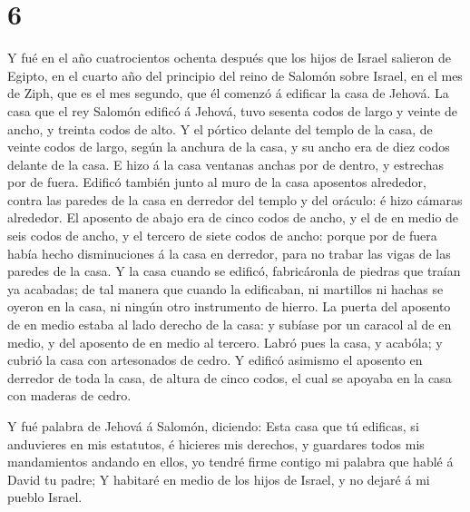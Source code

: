 \hypertarget{section-5}{%
\section{6}\label{section-5}}

 Y fué en el año cuatrocientos ochenta después que los hijos
de Israel salieron de Egipto, en el cuarto año del principio del reino
de Salomón sobre Israel, en el mes de Ziph, que es el mes segundo, que
él comenzó á edificar la casa de Jehová.  La casa que el rey
Salomón edificó á Jehová, tuvo sesenta codos de largo y veinte de ancho,
y treinta codos de alto.  Y el pórtico delante del templo de
la casa, de veinte codos de largo, según la anchura de la casa, y su
ancho era de diez codos delante de la casa.  E hizo á la
casa ventanas anchas por de dentro, y estrechas por de fuera.
 Edificó también junto al muro de la casa aposentos
alrededor, contra las paredes de la casa en derredor del templo y del
oráculo: é hizo cámaras alrededor.  El aposento de abajo era
de cinco codos de ancho, y el de en medio de seis codos de ancho, y el
tercero de siete codos de ancho: porque por de fuera había hecho
disminuciones á la casa en derredor, para no trabar las vigas de las
paredes de la casa.  Y la casa cuando se edificó,
fabricáronla de piedras que traían ya acabadas; de tal manera que cuando
la edificaban, ni martillos ni hachas se oyeron en la casa, ni ningún
otro instrumento de hierro.  La puerta del aposento de en
medio estaba al lado derecho de la casa: y subíase por un caracol al de
en medio, y del aposento de en medio al tercero.  Labró pues
la casa, y acabóla; y cubrió la casa con artesonados de cedro.
 Y edificó asimismo el aposento en derredor de toda la
casa, de altura de cinco codos, el cual se apoyaba en la casa con
maderas de cedro.

 Y fué palabra de Jehová á Salomón, diciendo: 
Esta casa que tú edificas, si anduvieres en mis estatutos, é hicieres
mis derechos, y guardares todos mis mandamientos andando en ellos, yo
tendré firme contigo mi palabra que hablé á David tu padre;
 Y habitaré en medio de los hijos de Israel, y no dejaré á
mi pueblo Israel.

